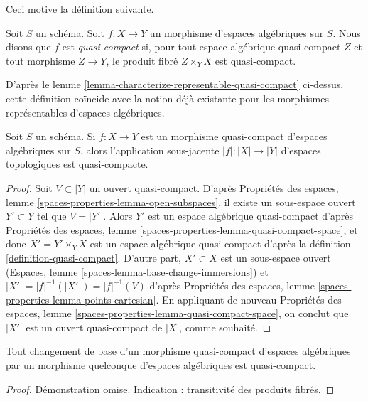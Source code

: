 \noindent
Ceci motive la définition suivante.

\begin{definition}
\label{definition-quasi-compact}
Soit $S$ un schéma.
Soit $f : X \to Y$ un morphisme d'espaces algébriques sur $S$.
Nous disons que $f$ est {\it quasi-compact} si, pour tout espace
algébrique quasi-compact $Z$ et tout morphisme $Z \to Y$, le produit fibré
$Z \times_Y X$ est quasi-compact.
\end{definition}

\noindent
D'après le lemme \ref{lemma-characterize-representable-quasi-compact}
ci-dessus, cette définition coïncide avec la notion déjà existante
pour les morphismes représentables d'espaces algébriques.

\begin{lemma}
\label{lemma-quasi-compact-is-quasi-compact}
Soit $S$ un schéma. Si $f : X \to Y$ est un morphisme quasi-compact
d'espaces algébriques sur $S$, alors l'application sous-jacente
$|f| : |X| \to |Y|$ d'espaces topologiques est quasi-compacte.
\end{lemma}

\begin{proof}
Soit $V \subset |Y|$ un ouvert quasi-compact. D'après Propriétés des espaces,
lemme \ref{spaces-properties-lemma-open-subspaces},
il existe un sous-espace ouvert $Y' \subset Y$ tel que $V = |Y'|$.
Alors $Y'$ est un espace algébrique quasi-compact d'après
Propriétés des espaces, lemme \ref{spaces-properties-lemma-quasi-compact-space},
et donc $X' = Y' \times_Y X$ est un espace algébrique
quasi-compact d'après la définition \ref{definition-quasi-compact}.
D'autre part, $X' \subset X$ est un sous-espace ouvert
(Espaces, lemme \ref{spaces-lemma-base-change-immersions})
et $|X'| = |f|^{-1}(|X'|) = |f|^{-1}(V)$ d'après
Propriétés des espaces, lemme \ref{spaces-properties-lemma-points-cartesian}.
En appliquant de nouveau
Propriétés des espaces, lemme \ref{spaces-properties-lemma-quasi-compact-space},
on conclut que $|X'|$ est un ouvert quasi-compact de $|X|$, comme souhaité.
\end{proof}

\begin{lemma}
\label{lemma-base-change-quasi-compact}
Tout changement de base d'un morphisme quasi-compact d'espaces algébriques
par un morphisme quelconque d'espaces algébriques est quasi-compact.
\end{lemma}

\begin{proof}
Démonstration omise. Indication : transitivité des produits fibrés.
\end{proof}

